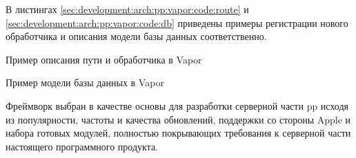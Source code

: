 В листингах \ref{sec:development:arch:pp:vapor:code:route} и \ref{sec:development:arch:pp:vapor:code:db} приведены примеры регистрации нового обработчика и описания модели базы данных соответственно.

\begin{code}
	
   \caption{Пример описания пути и обработчика в Vapor}
   \label{sec:development:arch:pp:vapor:code:route}
\end{code}

\begin{code}
	
   \caption{Пример модели базы данных в Vapor}
   \label{sec:development:arch:pp:vapor:code:db}
\end{code}

Фреймворк выбран в качестве основы для разработки серверной части \gls{pp} исходя из популярности, частоты и качества обновлений, поддержки со стороны Apple и набора готовых модулей, полностью покрывающих требования к серверной части настоящего программного продукта.